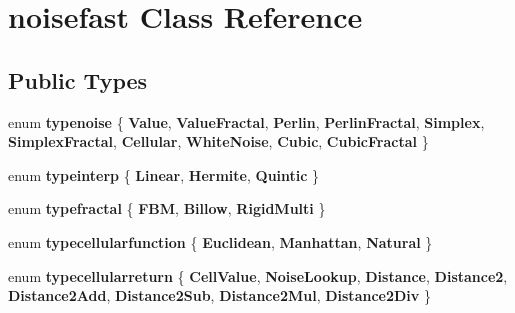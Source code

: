 \hypertarget{classnoisefast}{}\section{noisefast Class Reference}
\label{classnoisefast}
\subsection*{Public Types}
\begin{DoxyCompactItemize}
\item 
\mbox{\label{classnoisefast_aa0149d7d38d79d4393a9ea8cc57a4753}} 
enum {\bfseries typenoise} \{ \newline
{\bfseries Value}, 
{\bfseries Value\+Fractal}, 
{\bfseries Perlin}, 
{\bfseries Perlin\+Fractal}, 
\newline
{\bfseries Simplex}, 
{\bfseries Simplex\+Fractal}, 
{\bfseries Cellular}, 
{\bfseries White\+Noise}, 
\newline
{\bfseries Cubic}, 
{\bfseries Cubic\+Fractal}
 \}
\item 
\mbox{\label{classnoisefast_a3887c99f42d68b10173cf5d2e16b8238}} 
enum {\bfseries typeinterp} \{ {\bfseries Linear}, 
{\bfseries Hermite}, 
{\bfseries Quintic}
 \}
\item 
\mbox{\label{classnoisefast_a288b2a110375220b427697cd1b48bb72}} 
enum {\bfseries typefractal} \{ {\bfseries F\+BM}, 
{\bfseries Billow}, 
{\bfseries Rigid\+Multi}
 \}
\item 
\mbox{\label{classnoisefast_aa3ff9d6710792be27d55c8a89fce7395}} 
enum {\bfseries typecellularfunction} \{ {\bfseries Euclidean}, 
{\bfseries Manhattan}, 
{\bfseries Natural}
 \}
\item 
\mbox{\label{classnoisefast_aa6eba20ed841c0cdd275b12291c1fa0b}} 
enum {\bfseries typecellularreturn} \{ \newline
{\bfseries Cell\+Value}, 
{\bfseries Noise\+Lookup}, 
{\bfseries Distance}, 
{\bfseries Distance2}, 
\newline
{\bfseries Distance2\+Add}, 
{\bfseries Distance2\+Sub}, 
{\bfseries Distance2\+Mul}, 
{\bfseries Distance2\+Div}
 \}
\end{DoxyCompactItemize}

